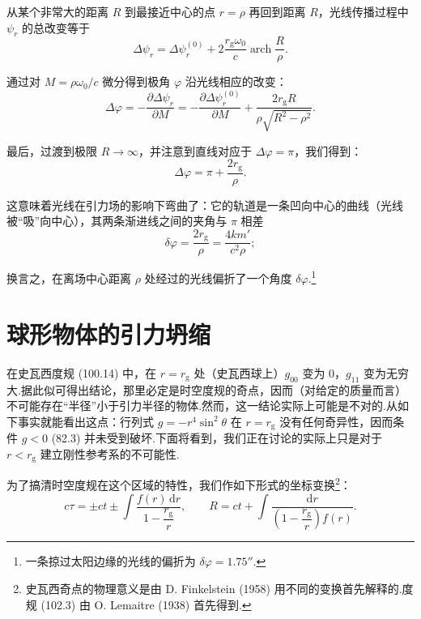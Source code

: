 从某个非常大的距离 $R$ 到最接近中心的点 $r=\rho$ 再回到距离 $R$，光线传播过程中 $\psi_r$ 的总改变等于
\begin{equation*}
  \Delta\psi_r=\Delta\psi_r^{(0)}
  +2\frac{r_{\mathrm{g}}\omega_0}{c}\operatorname{arch}\frac{R}{\rho}.
\end{equation*}

通过对 $M=\rho\omega_0/c$ 微分得到极角 $\varphi$ 沿光线相应的改变：
\begin{equation*}
  \Delta\varphi=-\frac{\partial\Delta\psi_r}{\partial M}
  =-\frac{\partial\Delta\psi_r^{(0)}}{\partial M}
  +\frac{2r_{\mathrm{g}}R}{\rho\sqrt{R^{2}-\rho^{2}}}.
\end{equation*}

最后，过渡到极限 $R\to\infty$，并注意到直线对应于 $\Delta\varphi=\pi$，我们得到：
\begin{equation*}
  \Delta\varphi=\pi+\frac{2r_{\mathrm{g}}}{\rho}.
\end{equation*}

这意味着光线在引力场的影响下弯曲了：它的轨道是一条凹向中心的曲线（光线被“吸”向中心），其两条渐进线之间的夹角与 $\pi$ 相差
\begin{equation}
  \delta\varphi=\frac{2r_{\mathrm{g}}}{\rho}
  =\frac{4km'}{c^{2}\rho};
\end{equation}

换言之，在离场中心距离 $\rho$ 处经过的光线偏折了一个角度 $\delta\varphi$.\footnote{一条掠过太阳边缘的光线的偏折为 $\delta\varphi=1.75''$.}

\section{球形物体的引力坍缩}

在史瓦西度规 (100.14) 中，在 $r=r_{\mathrm{g}}$ 处（史瓦西球上）$g_{00}$ 变为 0，$g_{11}$ 变为无穷大.据此似可得出结论，那里必定是时空度规的奇点，因而（对给定的质量而言）不可能存在“半径”小于引力半径的物体.然而，这一结论实际上可能是不对的.从如下事实就能看出这点：行列式 $g=-r^{4}\sin^{2}\theta$ 在 $r=r_{\mathrm{g}}$ 没有任何奇异性，因而条件 $g<0$ (82.3) 并未受到破坏.下面将看到，我们正在讨论的实际上只是对于 $r<r_{\mathrm{g}}$ 建立刚性参考系的不可能性.

为了搞清时空度规在这个区域的特性，我们作如下形式的坐标变换\footnote{史瓦西奇点的物理意义是由 D. Finkelstein (1958) 用不同的变换首先解释的.度规 (102.3) 由 O. Lemaitre (1938) 首先得到.}：
\begin{equation}
  c\tau=\pm ct\pm\int\frac{f(r)\,\mathrm{d}r}{1-\dfrac{r_{\mathrm{g}}}{r}},
  \qquad
  R=ct+\int\frac{\mathrm{d}r}{\left(1-\dfrac{r_{\mathrm{g}}}{r}\right)f(r)}.
\end{equation}


